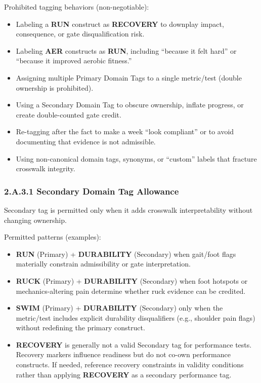 \documentclass[10pt]{article}
\begin{document}
Prohibited tagging behaviors (non-negotiable):

\begin{itemize}
\item Labeling a \textbf{RUN} construct as \textbf{RECOVERY} to downplay impact, consequence, or gate disqualification risk.
\item Labeling \textbf{AER} constructs as \textbf{RUN}, including “because it felt hard” or “because it improved aerobic fitness.”
\item Assigning multiple Primary Domain Tags to a single metric/test (double ownership is prohibited).
\item Using a Secondary Domain Tag to obscure ownership, inflate progress, or create double-counted gate credit.
\item Re-tagging after the fact to make a week “look compliant” or to avoid documenting that evidence is not admissible.
\item Using non-canonical domain tags, synonyms, or “custom” labels that fracture crosswalk integrity.
\end{itemize}

\subsubsection*{2.A.3.1 Secondary Domain Tag Allowance}

Secondary tag is permitted only when it adds crosswalk interpretability without changing ownership.

Permitted patterns (examples):

\begin{itemize}
\item \textbf{RUN} (Primary) + \textbf{DURABILITY} (Secondary) when gait/foot flags materially constrain admissibility or gate interpretation.
\item \textbf{RUCK} (Primary) + \textbf{DURABILITY} (Secondary) when foot hotspots or mechanics-altering pain determine whether ruck evidence can be credited.
\item \textbf{SWIM} (Primary) + \textbf{DURABILITY} (Secondary) only when the metric/test includes explicit durability disqualifiers (e.g., shoulder pain flags) without redefining the primary construct.
\item \textbf{RECOVERY} is generally not a valid Secondary tag for performance tests. Recovery markers influence readiness but do not co-own performance constructs. If needed, reference recovery constraints in validity conditions rather than applying \textbf{RECOVERY} as a secondary performance tag.
\end{itemize}
\end{document}
